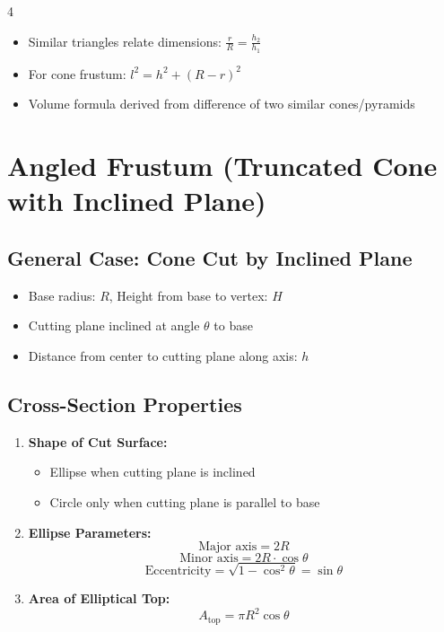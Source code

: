 \begin{multicols*}{4}
\begin{itemize}
    \item Similar triangles relate dimensions: $\frac{r}{R} = \frac{h_2}{h_1}$
    \item For cone frustum: $l^2 = h^2 + (R - r)^2$
    \item Volume formula derived from difference of two similar cones/pyramids
\end{itemize}

\section*{Angled Frustum (Truncated Cone with Inclined Plane)}

\subsection*{General Case: Cone Cut by Inclined Plane}

\begin{itemize}
    \item Base radius: $R$, Height from base to vertex: $H$
    \item Cutting plane inclined at angle $\theta$ to base
    \item Distance from center to cutting plane along axis: $h$
\end{itemize}

\subsection*{Cross-Section Properties}

\begin{enumerate}
    \item \textbf{Shape of Cut Surface:}
          \begin{itemize}
              \item Ellipse when cutting plane is inclined
              \item Circle only when cutting plane is parallel to base
          \end{itemize}
    
    \item \textbf{Ellipse Parameters:}
          \[ \text{Major axis} = 2R \]
          \[ \text{Minor axis} = 2R \cdot \cos\theta \]
          \[ \text{Eccentricity} = \sqrt{1 - \cos^2\theta} = \sin\theta \]
    
    \item \textbf{Area of Elliptical Top:}
          \[ A_{\text{top}} = \pi R^2 \cos\theta \]
\end{enumerate}


\end{multicols*}
